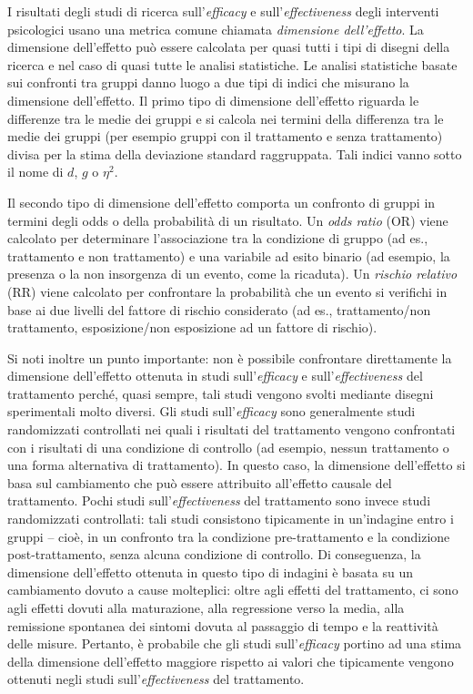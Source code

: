 \documentclass[
  11pt,
]{krantz}
\theoremstyle{definition}
\theoremstyle{definition}
\theoremstyle{definition}
\theoremstyle{definition}
\theoremstyle{remark}
\begin{document}
I risultati degli studi di ricerca sull'\emph{efficacy} e sull'\emph{effectiveness} degli interventi psicologici usano una metrica comune chiamata \emph{dimensione dell'effetto}. La dimensione dell'effetto può essere calcolata per quasi tutti i tipi di disegni della ricerca e nel caso di quasi tutte le analisi statistiche. Le analisi statistiche basate sui confronti tra gruppi danno luogo a due tipi di indici che misurano la dimensione dell'effetto. Il primo tipo di dimensione dell'effetto riguarda le differenze tra le medie dei gruppi e si calcola nei termini della differenza tra le medie dei gruppi (per esempio gruppi con il trattamento e senza trattamento) divisa per la stima della deviazione standard raggruppata. Tali indici vanno sotto il nome di \(d\), \(g\) o \(\eta^2\).

Il secondo tipo di dimensione dell'effetto comporta un confronto di gruppi in termini degli odds o della probabilità di un risultato. Un \emph{odds ratio} (OR) viene calcolato per determinare l'associazione tra la condizione di gruppo (ad es., trattamento e non trattamento) e una variabile ad esito binario (ad esempio, la presenza o la non insorgenza di un evento, come la ricaduta). Un \emph{rischio relativo} (RR) viene calcolato per confrontare la probabilità che un evento si verifichi in base ai due livelli del fattore di rischio considerato (ad es., trattamento/non trattamento, esposizione/non esposizione ad un fattore di rischio).

Si noti inoltre un punto importante: non è possibile confrontare direttamente la dimensione dell'effetto ottenuta in studi sull'\emph{efficacy} e sull'\emph{effectiveness} del trattamento perché, quasi sempre, tali studi vengono svolti mediante disegni sperimentali molto diversi. Gli studi sull'\emph{efficacy} sono generalmente studi randomizzati controllati nei quali i risultati del trattamento vengono confrontati con i risultati di una condizione di controllo (ad esempio, nessun trattamento o una forma alternativa di trattamento). In questo caso, la dimensione dell'effetto si basa sul cambiamento che può essere attribuito all'effetto causale del trattamento. Pochi studi sull'\emph{effectiveness} del trattamento sono invece studi randomizzati controllati: tali studi consistono tipicamente in un'indagine entro i gruppi -- cioè, in un confronto tra la condizione pre-trattamento e la condizione post-trattamento, senza alcuna condizione di controllo. Di conseguenza, la dimensione dell'effetto ottenuta in questo tipo di indagini è basata su un cambiamento dovuto a cause molteplici: oltre agli effetti del trattamento, ci sono agli effetti dovuti alla maturazione, alla regressione verso la media, alla remissione spontanea dei sintomi dovuta al passaggio di tempo e la reattività delle misure. Pertanto, è probabile che gli studi sull'\emph{efficacy} portino ad una stima della dimensione dell'effetto maggiore rispetto ai valori che tipicamente vengono ottenuti negli studi sull'\emph{effectiveness} del trattamento.
\end{document}
